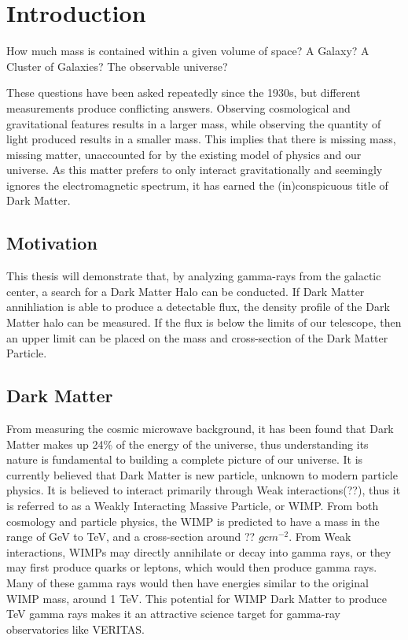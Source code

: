 \cleartooddpage[\thispagestyle{empty}]
\chapter{Introduction}

How much mass is contained within a given volume of space?
A Galaxy?
A Cluster of Galaxies?
The observable universe?

These questions have been asked repeatedly since the 1930s, but different measurements produce conflicting answers.
Observing cosmological and gravitational features results in a larger mass, while observing the quantity of light produced results in a smaller mass.
This implies that there is missing mass, missing matter, unaccounted for by the existing model of physics and our universe.
As this matter prefers to only interact gravitationally and seemingly ignores the electromagnetic spectrum, it has earned the (in)conspicuous title of Dark Matter.

\section{Motivation}
This thesis will demonstrate that, by analyzing gamma-rays from the galactic center, a search for a Dark Matter Halo can be conducted.
If Dark Matter annihliation is able to produce a detectable flux, the density profile of the Dark Matter halo can be measured.
If the flux is below the limits of our telescope, then an upper limit can be placed on the mass and cross-section of the Dark Matter Particle.

\section{Dark Matter}

From measuring the cosmic microwave background, it has been found that Dark Matter makes up 24\% of the energy of the universe\cite{pdg_2012}, thus understanding its nature is fundamental to building a complete picture of our universe.
It is currently believed that Dark Matter is new particle, unknown to modern particle physics.
It is believed to interact primarily through Weak interactions(??), thus it is referred to as a Weakly Interacting Massive Particle, or WIMP.
From both cosmology and particle physics, the WIMP is predicted to have a mass in the range of GeV to TeV, and a cross-section around ?? $gcm^{-2}$.
From Weak interactions, WIMPs may directly annihilate or decay into gamma rays, or they may first produce quarks or leptons, which would then produce gamma rays.
Many of these gamma rays would then have energies similar to the original WIMP mass, around 1 TeV.
This potential for WIMP Dark Matter to produce TeV gamma rays makes it an attractive science target for gamma-ray observatories like VERITAS.

